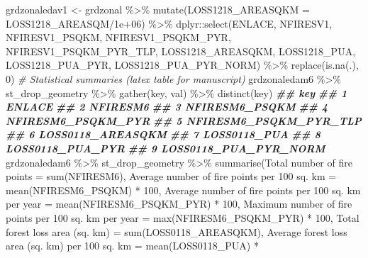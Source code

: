 \documentclass[10pt,landscape,a3paper]{article}
\newenvironment{Shaded}{\begin{snugshade}}{\end{snugshade}}
\newcommand{\AttributeTok}[1]{\textcolor[rgb]{0.77,0.63,0.00}{#1}}
\newcommand{\CommentTok}[1]{\textcolor[rgb]{0.56,0.35,0.01}{\textit{#1}}}
\newcommand{\DecValTok}[1]{\textcolor[rgb]{0.00,0.00,0.81}{#1}}
\newcommand{\DocumentationTok}[1]{\textcolor[rgb]{0.56,0.35,0.01}{\textbf{\textit{#1}}}}
\newcommand{\FloatTok}[1]{\textcolor[rgb]{0.00,0.00,0.81}{#1}}
\newcommand{\FunctionTok}[1]{\textcolor[rgb]{0.00,0.00,0.00}{#1}}
\newcommand{\NormalTok}[1]{#1}
\newcommand{\OtherTok}[1]{\textcolor[rgb]{0.56,0.35,0.01}{#1}}
\newcommand{\SpecialCharTok}[1]{\textcolor[rgb]{0.00,0.00,0.00}{#1}}
\newcommand{\StringTok}[1]{\textcolor[rgb]{0.31,0.60,0.02}{#1}}
\begin{document}
\begin{Shaded}
\begin{Highlighting}[]
\NormalTok{grdzonaledav1 }\OtherTok{\textless{}{-}}\NormalTok{ grdzonal }\SpecialCharTok{\%\textgreater{}\%}
    \FunctionTok{mutate}\NormalTok{(}\AttributeTok{LOSS1218\_AREASQKM =}\NormalTok{ LOSS1218\_AREASQM}\SpecialCharTok{/}\FloatTok{1e+06}\NormalTok{) }\SpecialCharTok{\%\textgreater{}\%}
\NormalTok{    dplyr}\SpecialCharTok{::}\FunctionTok{select}\NormalTok{(ENLACE, NFIRESV1, NFIRESV1\_PSQKM, NFIRESV1\_PSQKM\_PYR, NFIRESV1\_PSQKM\_PYR\_TLP,}
\NormalTok{        LOSS1218\_AREASQKM, LOSS1218\_PUA, LOSS1218\_PUA\_PYR, LOSS1218\_PUA\_PYR\_NORM) }\SpecialCharTok{\%\textgreater{}\%}
    \FunctionTok{replace}\NormalTok{(}\FunctionTok{is.na}\NormalTok{(.), }\DecValTok{0}\NormalTok{)}
\CommentTok{\# Statistical summaries (latex table for manuscript)}
\NormalTok{grdzonaledam6 }\SpecialCharTok{\%\textgreater{}\%}
\NormalTok{    st\_drop\_geometry }\SpecialCharTok{\%\textgreater{}\%}
    \FunctionTok{gather}\NormalTok{(key, val) }\SpecialCharTok{\%\textgreater{}\%}
    \FunctionTok{distinct}\NormalTok{(key)}
\DocumentationTok{\#\#                      key}
\DocumentationTok{\#\# 1                 ENLACE}
\DocumentationTok{\#\# 2               NFIRESM6}
\DocumentationTok{\#\# 3         NFIRESM6\_PSQKM}
\DocumentationTok{\#\# 4     NFIRESM6\_PSQKM\_PYR}
\DocumentationTok{\#\# 5 NFIRESM6\_PSQKM\_PYR\_TLP}
\DocumentationTok{\#\# 6      LOSS0118\_AREASQKM}
\DocumentationTok{\#\# 7           LOSS0118\_PUA}
\DocumentationTok{\#\# 8       LOSS0118\_PUA\_PYR}
\DocumentationTok{\#\# 9  LOSS0118\_PUA\_PYR\_NORM}
\NormalTok{grdzonaledam6 }\SpecialCharTok{\%\textgreater{}\%}
\NormalTok{    st\_drop\_geometry }\SpecialCharTok{\%\textgreater{}\%}
    \FunctionTok{summarise}\NormalTok{(}\StringTok{\textasciigrave{}}\AttributeTok{Total number of fire points}\StringTok{\textasciigrave{}} \OtherTok{=} \FunctionTok{sum}\NormalTok{(NFIRESM6), }\StringTok{\textasciigrave{}}\AttributeTok{Average number of fire points per 100 sq. km}\StringTok{\textasciigrave{}} \OtherTok{=} \FunctionTok{mean}\NormalTok{(NFIRESM6\_PSQKM) }\SpecialCharTok{*}
        \DecValTok{100}\NormalTok{, }\StringTok{\textasciigrave{}}\AttributeTok{Average number of fire points per 100 sq. km per year}\StringTok{\textasciigrave{}} \OtherTok{=} \FunctionTok{mean}\NormalTok{(NFIRESM6\_PSQKM\_PYR) }\SpecialCharTok{*}
        \DecValTok{100}\NormalTok{, }\StringTok{\textasciigrave{}}\AttributeTok{Maximum number of fire points per 100 sq. km per year}\StringTok{\textasciigrave{}} \OtherTok{=} \FunctionTok{max}\NormalTok{(NFIRESM6\_PSQKM\_PYR) }\SpecialCharTok{*}
        \DecValTok{100}\NormalTok{, }\StringTok{\textasciigrave{}}\AttributeTok{Total forest loss area (sq. km)}\StringTok{\textasciigrave{}} \OtherTok{=} \FunctionTok{sum}\NormalTok{(LOSS0118\_AREASQKM), }\StringTok{\textasciigrave{}}\AttributeTok{Average forest loss area (sq. km) per 100 sq. km}\StringTok{\textasciigrave{}} \OtherTok{=} \FunctionTok{mean}\NormalTok{(LOSS0118\_PUA) }\SpecialCharTok{*}

\end{Highlighting}
\end{Shaded}
\end{document}
